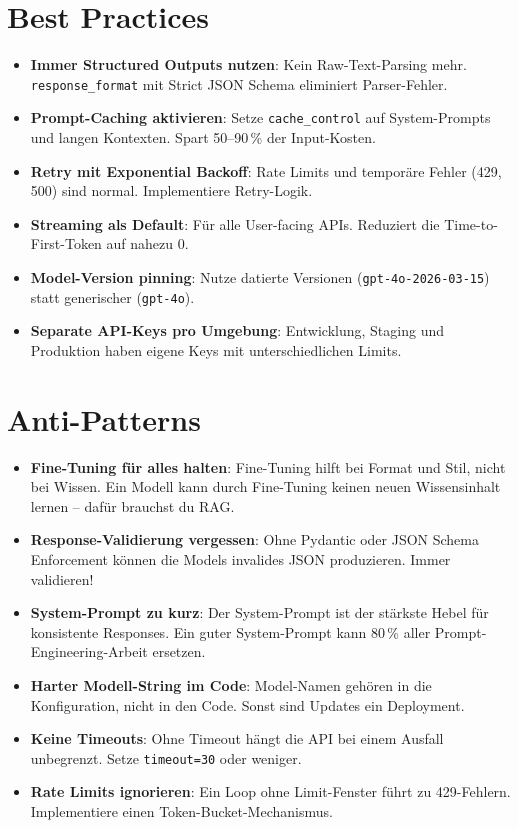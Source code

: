 \section{Best Practices}

\begin{itemize}[leftmargin=*]
    \item \textbf{Immer Structured Outputs nutzen}: Kein Raw-Text-Parsing mehr. \texttt{response\_format} mit Strict JSON Schema eliminiert Parser-Fehler.
    \item \textbf{Prompt-Caching aktivieren}: Setze \texttt{cache\_control} auf System-Prompts und langen Kontexten. Spart 50--90\,\% der Input-Kosten.
    \item \textbf{Retry mit Exponential Backoff}: Rate Limits und temporäre Fehler (429, 500) sind normal. Implementiere Retry-Logik.
    \item \textbf{Streaming als Default}: Für alle User-facing APIs. Reduziert die Time-to-First-Token auf nahezu 0.
    \item \textbf{Model-Version pinning}: Nutze datierte Versionen (\texttt{gpt-4o-2026-03-15}) statt generischer (\texttt{gpt-4o}).
    \item \textbf{Separate API-Keys pro Umgebung}: Entwicklung, Staging und Produktion haben eigene Keys mit unterschiedlichen Limits.
\end{itemize}

\section{Anti-Patterns}

\begin{itemize}[leftmargin=*]
    \item \textbf{Fine-Tuning für alles halten}: Fine-Tuning hilft bei Format und Stil, nicht bei Wissen. Ein Modell kann durch Fine-Tuning keinen neuen Wissensinhalt lernen -- dafür brauchst du RAG.
    \item \textbf{Response-Validierung vergessen}: Ohne Pydantic oder JSON Schema Enforcement können die Models invalides JSON produzieren. Immer validieren!
    \item \textbf{System-Prompt zu kurz}: Der System-Prompt ist der stärkste Hebel für konsistente Responses. Ein guter System-Prompt kann 80\,\% aller Prompt-Engineering-Arbeit ersetzen.
    \item \textbf{Harter Modell-String im Code}: Model-Namen gehören in die Konfiguration, nicht in den Code. Sonst sind Updates ein Deployment.
    \item \textbf{Keine Timeouts}: Ohne Timeout hängt die API bei einem Ausfall unbegrenzt. Setze \texttt{timeout=30} oder weniger.
    \item \textbf{Rate Limits ignorieren}: Ein Loop ohne Limit-Fenster führt zu 429-Fehlern. Implementiere einen Token-Bucket-Mechanismus.
\end{itemize}

